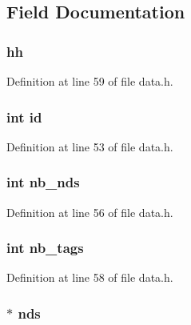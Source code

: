 \subsection{Field Documentation}
\subsubsection[{\texorpdfstring{hh}{hh}}]{ hh}\hypertarget{struct_way_a67d3d81a4f9a9622b0befade8d131661}{}\label{struct_way_a67d3d81a4f9a9622b0befade8d131661}


Definition at line 59 of file data.\+h.

\subsubsection[{\texorpdfstring{id}{id}}]{\setlength{\rightskip}{0pt plus 5cm}int id}\hypertarget{struct_way_a7441ef0865bcb3db9b8064dd7375c1ea}{}\label{struct_way_a7441ef0865bcb3db9b8064dd7375c1ea}


Definition at line 53 of file data.\+h.

\subsubsection[{\texorpdfstring{nb\+\_\+nds}{nb_nds}}]{\setlength{\rightskip}{0pt plus 5cm}int nb\+\_\+nds}\hypertarget{struct_way_a2a8e25be588f6da164fe5fea4040d76c}{}\label{struct_way_a2a8e25be588f6da164fe5fea4040d76c}


Definition at line 56 of file data.\+h.

\subsubsection[{\texorpdfstring{nb\+\_\+tags}{nb_tags}}]{\setlength{\rightskip}{0pt plus 5cm}int nb\+\_\+tags}\hypertarget{struct_way_a5090182abe45c6d1577adb6c195378f3}{}\label{struct_way_a5090182abe45c6d1577adb6c195378f3}


Definition at line 58 of file data.\+h.

\subsubsection[{\texorpdfstring{nds}{nds}}]{$\ast$ nds}\hypertarget{struct_way_aeda4fa95d94e394e147ebf2bfe497071}{}\label{struct_way_aeda4fa95d94e394e147ebf2bfe497071}


